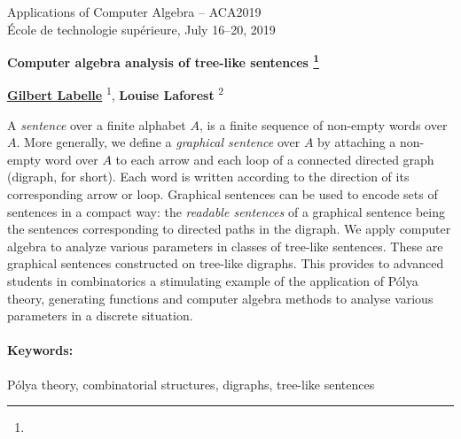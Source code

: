\documentclass{article}
\makeatletter
\newcommand{\TITLE}[2][]{
  \begin{center} \Large \bfseries #2%
  \def\@temp{#1}\ifx\@temp\@empty\relax\else\footnote{#1}\fi\end{center}}
\newcommand{\AUTHOR}[2][]{\textbf{#2}%
  \def\@temp{#1}\ifx\@temp\@empty\relax\else\textsuperscript{#1}\fi}
\newcommand{\KEYWORDS}[1]{\paragraph{Keywords:} #1}
\newcommand{\HEADING}{
{\noindent \small Applications of Computer Algebra -- ACA2019 \\
\'Ecole de technologie sup\'erieure, July 16--20, 2019} \vspace{10pt}}
\makeatother
\begin{document}
\HEADING


\TITLE{Computer algebra analysis of tree-like sentences}




\begin{center}
 \AUTHOR[1]{\underline{Gilbert Labelle}}, %
 \AUTHOR[2]{Louise Laforest}
\end{center}



A \emph{sentence} over a finite alphabet $A$, is a finite sequence of non-empty words over $A$. More generally, we define a \emph{graphical sentence} over $A$ by attaching a non-empty word over $A$ to each arrow and each loop of a connected directed graph (digraph, for short). Each word is written according to the direction of its corresponding arrow or loop. Graphical sentences can be used to encode sets of sentences in a compact way: the \emph{readable sentences} of a graphical sentence being the sentences corresponding to directed paths in the digraph. We apply computer algebra to analyze various parameters in classes of tree-like sentences. These are graphical sentences constructed on tree-like digraphs. This provides to advanced students in combinatorics a stimulating example of the application of P\'olya theory, generating functions and computer algebra methods to analyse various parameters in a discrete situation.  



\KEYWORDS {P\'{o}lya theory, combinatorial structures, digraphs, tree-like sentences}


\end{document}
